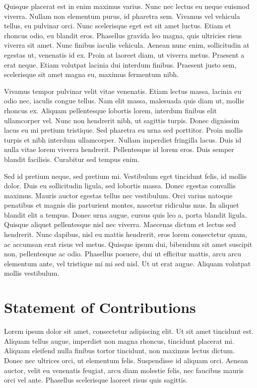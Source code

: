 \documentclass[conference]{IEEEtran}
\begin{document}
Quisque placerat est in enim maximus varius. Nunc nec lectus eu neque euismod viverra. Nullam non elementum purus, id pharetra sem. Vivamus vel vehicula tellus, eu pulvinar orci. Nunc scelerisque eget est sit amet luctus. Etiam et rhoncus odio, eu blandit eros. Phasellus gravida leo magna, quis ultricies risus viverra sit amet. Nunc finibus iaculis vehicula. Aenean nunc enim, sollicitudin at egestas ut, venenatis id ex. Proin at laoreet diam, ut viverra metus. Praesent a erat neque. Etiam volutpat lacinia dui interdum finibus. Praesent justo sem, scelerisque sit amet magna eu, maximus fermentum nibh.

Vivamus tempor pulvinar velit vitae venenatis. Etiam lectus massa, lacinia eu odio nec, iaculis congue tellus. Nam elit massa, malesuada quis diam ut, mollis rhoncus ex. Aliquam pellentesque lobortis lorem, interdum finibus elit ullamcorper vel. Nunc non hendrerit nibh, ut sagittis turpis. Donec dignissim lacus eu mi pretium tristique. Sed pharetra eu urna sed porttitor. Proin mollis turpis et nibh interdum ullamcorper. Nullam imperdiet fringilla lacus. Duis id nulla vitae lorem viverra hendrerit. Pellentesque id lorem eros. Duis semper blandit facilisis. Curabitur sed tempus enim.

Sed id pretium neque, sed pretium mi. Vestibulum eget tincidunt felis, id mollis dolor. Duis eu sollicitudin ligula, sed lobortis massa. Donec egestas convallis maximus. Mauris auctor egestas tellus nec vestibulum. Orci varius natoque penatibus et magnis dis parturient montes, nascetur ridiculus mus. In aliquet blandit elit a tempus. Donec urna augue, cursus quis leo a, porta blandit ligula. Quisque aliquet pellentesque nisl nec viverra. Maecenas dictum et lectus sed hendrerit. Nunc dapibus, nisl eu mattis hendrerit, eros lorem consectetur quam, ac accumsan erat risus vel metus. Quisque ipsum dui, bibendum sit amet suscipit non, pellentesque ac odio. Phasellus posuere, dui ut efficitur mattis, arcu arcu elementum ante, vel tristique mi mi sed nisl. Ut ut erat augue. Aliquam volutpat mollis vestibulum. 

\section{Statement of Contributions}

Lorem ipsum dolor sit amet, consectetur adipiscing elit. Ut sit amet tincidunt est. Aliquam tellus augue, imperdiet non magna rhoncus, tincidunt placerat mi. Aliquam eleifend nulla finibus tortor tincidunt, non maximus lectus dictum. Donec nec ultrices orci, ut elementum felis. Suspendisse id aliquam orci. Aenean auctor, velit eu venenatis feugiat, arcu diam molestie felis, nec faucibus mauris orci vel ante. Phasellus scelerisque laoreet risus quis sagittis.
\end{document}
